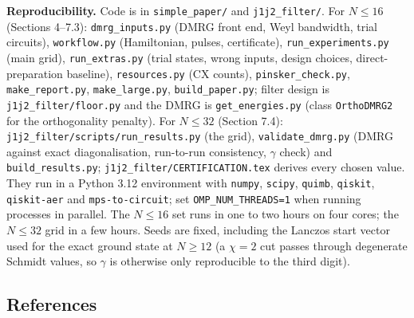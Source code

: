 \documentclass[
]{article}
\begin{document}
\textbf{Reproducibility.} Code is in \texttt{simple\_paper/} and
\texttt{j1j2\_filter/}. For \(N\le16\) (Sections 4--7.3):
\texttt{dmrg\_inputs.py} (DMRG front end, Weyl bandwidth, trial
circuits), \texttt{workflow.py} (Hamiltonian, pulses, certificate),
\texttt{run\_experiments.py} (main grid), \texttt{run\_extras.py} (trial
states, wrong inputs, design choices, direct-preparation baseline),
\texttt{resources.py} (CX counts), \texttt{pinsker\_check.py},
\texttt{make\_report.py}, \texttt{make\_large.py},
\texttt{build\_paper.py}; filter design is
\texttt{j1j2\_filter/floor.py} and the DMRG is \texttt{get\_energies.py}
(class \texttt{OrthoDMRG2} for the orthogonality penalty). For
\(N\le32\) (Section 7.4): \texttt{j1j2\_filter/scripts/run\_results.py}
(the grid), \texttt{validate\_dmrg.py} (DMRG against exact
diagonalisation, run-to-run consistency, \(\gamma\) check) and
\texttt{build\_results.py}; \texttt{j1j2\_filter/CERTIFICATION.tex}
derives every chosen value. They run in a Python 3.12 environment with
\texttt{numpy}, \texttt{scipy}, \texttt{quimb}, \texttt{qiskit},
\texttt{qiskit-aer} and \texttt{mps-to-circuit}; set
\texttt{OMP\_NUM\_THREADS=1} when running processes in parallel. The
\(N\le16\) set runs in one to two hours on four cores; the \(N\le32\)
grid in a few hours. Seeds are fixed, including the Lanczos start vector
used for the exact ground state at \(N\ge12\) (a \(\chi=2\) cut passes
through degenerate Schmidt values, so \(\gamma\) is otherwise only
reproducible to the third digit).

\hypertarget{references}{%
\subsection{References}\label{references}}
\end{document}
